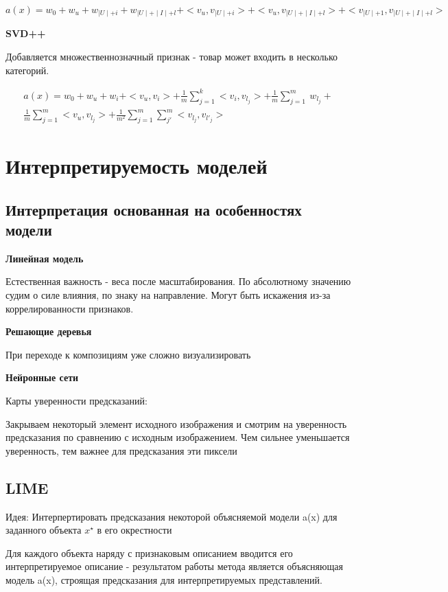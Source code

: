 \documentclass[a4paper, 12pt]{article}
\begin{document}
\[a(x) = w_0 + w_u + w_{\mid U \mid + i} + 
w_{\mid U \mid + \mid I \mid + l}
+ <v_u, v_{\mid U \mid + i}>
+ <v_u, v_{\mid U \mid + \mid I \mid + l}> + 
<v_{\mid U \mid + 1}, v_{\mid U \mid + \mid I \mid + l}>\]

\textbf{SVD++}

Добавляется множественнозначный признак - товар может входить в несколько 
категорий. 

\begin{align*}
    a(x) = w_0 + w_u + w_i + <v_u, v_i>
    + \frac{1}{m}\sum_{j = 1}^k <v_i, v_{l_j}>
    + \frac{1}{m} \sum_{j = 1}^m\ w_{l_j} + \\
    \frac{1}{m} \sum_{j = 1}^m <v_u, v_{l_j}> 
    + \frac{1}{m^2} \sum_{j = 1}^m \sum_{j'}^m <v_{l_j}, v_{l'_j}>
\end{align*}


\section{Интерпретируемость моделей}

\subsection{Интерпретация основанная на особенностях модели}

\textbf{Линейная модель}

Естественная важность - веса после масштабирования.
По абсолютному значению судим о силе влияния, по знаку на направление.
Могут быть искажения из-за коррелированности признаков.

\textbf{Решающие деревья}

При переходе к композициям уже сложно визуализировать

\textbf{Нейронные сети}

Карты уверенности предсказаний:

Закрываем некоторый элемент исходного изображения
и смотрим на уверенность предсказания по сравнению 
с исходным изображением. Чем сильнее уменьшается 
уверенность, тем важнее для предсказания эти пиксели

\subsection{LIME}

Идея: Интерпертировать предсказания некоторой 
объясняемой модели a(x) для заданного объекта 
$x^{\star}$ в его окрестности

Для каждого объекта наряду с признаковым описанием
вводится его интерпретируемое описание -
результатом работы метода является 
объясняющая модель a(x), строящая предсказания
для интерпретируемых представлений.
\end{document}
